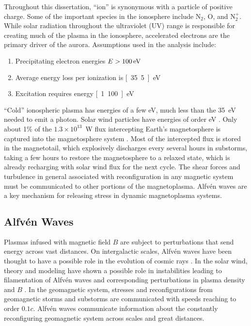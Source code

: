 Throughout this dissertation, ``ion'' is synonymous with a particle of positive charge. Some of the important species in the ionosphere include N$_2$, O, and N$_2^+$. 
While solar radiation throughout the ultraviolet (UV) range is responsible \citep{rees1989} for creating much of the plasma in the ionosphere, accelerated electrons are the primary driver of the aurora. 
Assumptions used in the analysis include:
\begin{enumerate}
    \item Precipitating electron energies $E > \unit[100]{eV}$
    \item Average energy loss per ionization is \unit[35.5]{eV}
    \item Excitation requires energy \unit[1..100]{eV}
\end{enumerate}
``Cold'' ionospheric plasma has energies of a few eV, much less than the 35~eV needed to emit a photon.
Solar wind particles have energies of order \unit[100]{eV} \citep{mottez2015}.
Only about 1\% of the $1.3 \times 10^{13}$~W flux intercepting Earth's magnetosphere is captured into the magnetosphere system \citep{mottez2015}.
Most of the intercepted flux is stored in the magnetotail, which explosively discharges every several hours in substorms, taking a few hours to restore the magnetosphere to a relaxed state, which is already recharging with solar wind flux for the next cycle.
The shear forces and turbulence in general associated with reconfiguration in any magnetic system must be communicated to other portions of the magnetoplasma.
Alfvén waves are a key mechanism for releasing stress in dynamic magnetoplasma systems.

\FloatBarrier
\subsection{Alfvén Waves}\label{sec:alfven}
Plasmas infused with magnetic field $B$ are subject to perturbations that send energy across vast distances.
On intergalactic scales, Alfvén waves have been thought to have a possible role in the evolution of cosmic rays \citep{matsukiyo2009}.
In the solar wind, theory and modeling have shown a possible role in instabilities leading to filamentation of Alfvén waves and corresponding perturbations in plasma density and $B$ \citep{kuo1988}.
In the geomagnetic system, stresses and reconfigurations from geomagnetic storms and substorms are communicated with speeds reaching to order $0.1c$. 
Alfvén waves communicate information about the constantly reconfiguring geomagnetic system across scales and great distances.

